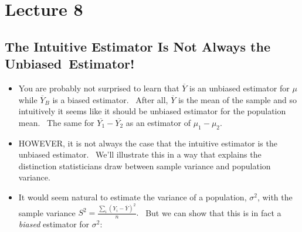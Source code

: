\documentclass[11pt]{article}
\begin{document}
\section{Lecture 8}

\subsection{The Intuitive Estimator Is Not Always the Unbiased\ Estimator!}

\begin{itemize}
\item You are probably not surprised to learn that $\overline{Y}$ is an
unbiased estimator for $\mu $ while $\overline{Y}_{B}$ is a biased
estimator. \ After all, $\overline{Y}$ is the mean of the sample and so
intuitively it seems like it should be unbiased estimator for the population
mean. \ The same for $\overline{Y_{1}}-\overline{Y_{2}}$ as an estimator of $%
\mu _{1}-\mu _{2}.$

\item HOWEVER, it is not always the case that the intuitive estimator is the
unbiased estimator. \ We'll illustrate this in a way that explains the
distinction statisticians draw between sample variance and population
variance.

\item It would seem natural to estimate the variance of a population, $%
\sigma ^{2}$, with the sample variance $S^{2}=\frac{\sum\nolimits_{i}\left(
Y_{i}-\overline{Y}\right) ^{2}}{n}.$ \ But we can show that this is in fact
a \textit{biased} estimator for $\sigma ^{2}$:
\end{itemize}
\end{document}
